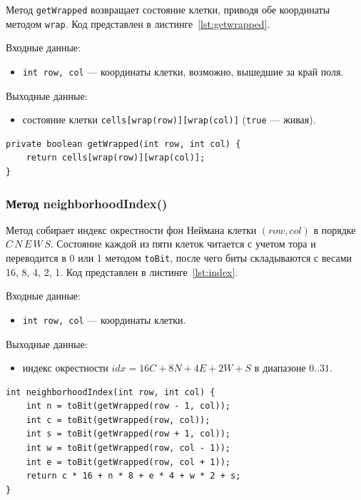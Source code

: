 Метод \texttt{getWrapped} возвращает состояние клетки, приводя обе координаты методом \texttt{wrap}. Код представлен в листинге~\ref{lst:getwrapped}.

Входные данные:
\begin{itemize}
	\item \texttt{int row, col} --- координаты клетки, возможно, вышедшие за край поля.
\end{itemize}

Выходные данные:
\begin{itemize}
	\item состояние клетки \texttt{cells[wrap(row)][wrap(col)]} (\texttt{true} --- живая).
\end{itemize}

\begin{lstlisting}[caption={Метод getWrapped()}, label={lst:getwrapped}]
private boolean getWrapped(int row, int col) {
	return cells[wrap(row)][wrap(col)];
}
\end{lstlisting}

\subsubsection*{Метод neighborhoodIndex()}

Метод собирает индекс окрестности фон Неймана клетки $(row, col)$ в порядке $C\,N\,E\,W\,S$. Состояние каждой из пяти клеток читается с учетом тора и переводится в 0 или 1 методом \texttt{toBit}, после чего биты складываются с весами 16, 8, 4, 2, 1. Код представлен в листинге~\ref{lst:index}.

Входные данные:
\begin{itemize}
	\item \texttt{int row, col} --- координаты клетки.
\end{itemize}

Выходные данные:
\begin{itemize}
	\item индекс окрестности $idx = 16C + 8N + 4E + 2W + S$ в диапазоне $0..31$.
\end{itemize}

\begin{lstlisting}[caption={Метод neighborhoodIndex()}, label={lst:index}]
int neighborhoodIndex(int row, int col) {
	int n = toBit(getWrapped(row - 1, col));
	int c = toBit(getWrapped(row, col));
	int s = toBit(getWrapped(row + 1, col));
	int w = toBit(getWrapped(row, col - 1));
	int e = toBit(getWrapped(row, col + 1));
	return c * 16 + n * 8 + e * 4 + w * 2 + s;
}
\end{lstlisting}

